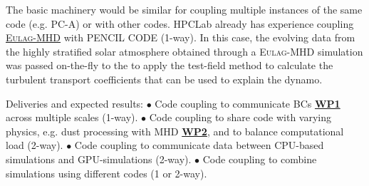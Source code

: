 \documentclass[a4paper,12pt]{article}
\newcommand{\wpref}[1]{\protect\hyperlink{wp#1}{\textbf{WP#1}}}
\begin{document}
The basic machinery would be similar for coupling multiple instances of the
same code (e.g.  PC-A) or with other codes.  HPCLab already has experience
coupling
\href{https://www.astro.umontreal.ca/~paulchar/grps/eulag-mhd.html}{\textsc{Eulag-MHD}}
\citep{Guerrero:2024} with \textsc{PENCIL CODE} (1-way).  In this case, the
evolving data from the highly stratified solar atmosphere  obtained through a
\textsc{Eulag-MHD} simulation was passed on-the-fly to the  to
apply the test-field method to calculate the turbulent transport coefficients
that can be used to explain the dynamo.

\tabto{0em}
Deliveries and expected results:
\tabto{0em}
$\bullet$ Code coupling to communicate BCs \wpref{1} across multiple scales (1-way).
\tabto{0em}
$\bullet$ Code coupling to share code with varying physics, e.g. dust processing with MHD \wpref{2}, and to balance computational load (2-way).
\tabto{0em}
$\bullet$ Code coupling to communicate data between CPU-based simulations and GPU-simulations (2-way).
\tabto{0em}
$\bullet$ Code coupling to combine simulations using different codes (1 or 2-way).

\end{document}
